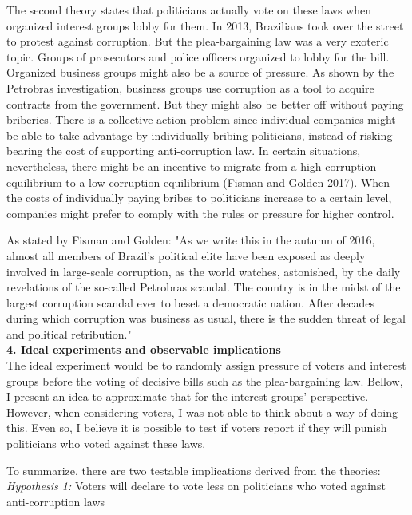 \documentclass[12pt,a4paper]{article}
\begin{document}
The second theory states that politicians actually vote on these laws when organized interest groups lobby for them. In 2013, Brazilians took over the street to protest against corruption. But the plea-bargaining law was a very exoteric topic. Groups of prosecutors and police officers organized to lobby for the bill. Organized business groups might also be a source of pressure. As shown by the Petrobras investigation, business groups use corruption as a tool to acquire contracts from the government. But they might also be better off without paying briberies. There is a collective action problem since individual companies might be able to take advantage by individually bribing politicians, instead of risking bearing the cost of supporting anti-corruption law. In certain situations, nevertheless, there might be an incentive to migrate from a high corruption equilibrium to a low corruption equilibrium (Fisman and Golden 2017). When the costs of individually paying bribes to politicians increase to a certain level, companies might prefer to comply with the rules or pressure for higher control. 

As stated by Fisman and Golden: "As we write this in the autumn of 2016, almost all members of Brazil's political elite have been exposed as deeply involved in large-scale corruption, as the world watches, astonished, by the daily revelations of the so-called Petrobras scandal. The country is in the midst of the largest corruption scandal ever to beset a democratic nation. After decades during which corruption was business as usual, there is the sudden threat of legal and political retribution."   \\


\textbf{4. Ideal experiments and observable implications}\\

The ideal experiment would be to randomly assign pressure of voters and interest groups before the voting of decisive bills such as the plea-bargaining law. Bellow, I present an idea to approximate that for the interest groups' perspective. However, when considering voters, I was not able to think about a way of doing this. Even so, I believe it is possible to test if voters report if they will punish politicians who voted against these laws.  

To summarize, there are two testable implications derived from the theories:\\


\emph{Hypothesis 1:} Voters will declare to vote less on politicians who voted against anti-corruption laws\\
\end{document}
